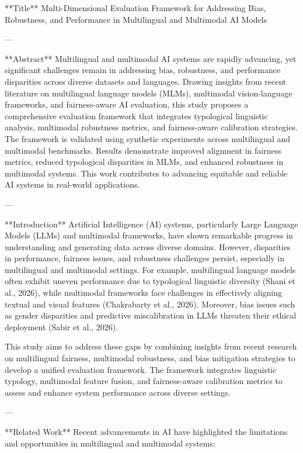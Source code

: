 **Title**  
Multi-Dimensional Evaluation Framework for Addressing Bias, Robustness, and Performance in Multilingual and Multimodal AI Models  

---

**Abstract**  
Multilingual and multimodal AI systems are rapidly advancing, yet significant challenges remain in addressing bias, robustness, and performance disparities across diverse datasets and languages. Drawing insights from recent literature on multilingual language models (MLMs), multimodal vision-language frameworks, and fairness-aware AI evaluation, this study proposes a comprehensive evaluation framework that integrates typological linguistic analysis, multimodal robustness metrics, and fairness-aware calibration strategies. The framework is validated using synthetic experiments across multilingual and multimodal benchmarks. Results demonstrate improved alignment in fairness metrics, reduced typological disparities in MLMs, and enhanced robustness in multimodal systems. This work contributes to advancing equitable and reliable AI systems in real-world applications.  

---

**Introduction**  
Artificial Intelligence (AI) systems, particularly Large Language Models (LLMs) and multimodal frameworks, have shown remarkable progress in understanding and generating data across diverse domains. However, disparities in performance, fairness issues, and robustness challenges persist, especially in multilingual and multimodal settings. For example, multilingual language models often exhibit uneven performance due to typological linguistic diversity (Shani et al., 2026), while multimodal frameworks face challenges in effectively aligning textual and visual features (Chakrabarty et al., 2026). Moreover, bias issues such as gender disparities and predictive miscalibration in LLMs threaten their ethical deployment (Sabir et al., 2026).  

This study aims to address these gaps by combining insights from recent research on multilingual fairness, multimodal robustness, and bias mitigation strategies to develop a unified evaluation framework. The framework integrates linguistic typology, multimodal feature fusion, and fairness-aware calibration metrics to assess and enhance system performance across diverse settings.  

---

**Related Work**  
Recent advancements in AI have highlighted the limitations and opportunities in multilingual and multimodal systems:  

